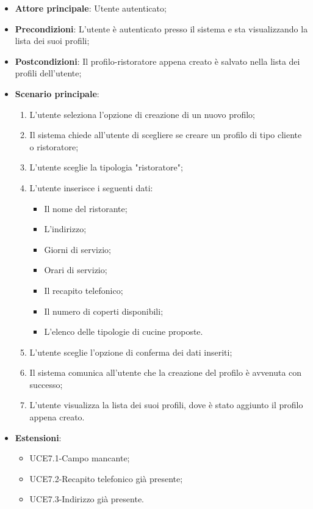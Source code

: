 \begin{itemize}
\item \textbf{Attore principale}: Utente autenticato;
\item \textbf{Precondizioni}: L'utente è autenticato presso il sistema e sta visualizzando la lista dei suoi profili;
\item \textbf{Postcondizioni}: Il profilo-ristoratore appena creato è salvato nella lista dei profili dell'utente;
\item \textbf{Scenario principale}:
\begin{enumerate}
\item L'utente seleziona l'opzione di creazione di un nuovo profilo;
\item Il sistema chiede all'utente di scegliere se creare un profilo di tipo cliente o ristoratore;
\item L'utente sceglie la tipologia "ristoratore";
\item L'utente inserisce i seguenti dati:
\begin{itemize}
\item Il nome del ristorante;
\item L'indirizzo;
\item Giorni di servizio;
\item Orari di servizio;
\item Il recapito telefonico;
\item Il numero di coperti disponibili;
\item L'elenco delle tipologie di cucine proposte.
\end{itemize}
\item L'utente sceglie l'opzione di conferma dei dati inseriti;
\item Il sistema comunica all'utente che la creazione del profilo è avvenuta con successo;
\item L'utente visualizza la lista dei suoi profili, dove è stato aggiunto il profilo appena creato.
\end{enumerate}
\item \textbf{Estensioni}:
\begin{itemize}
\item UCE7.1-Campo mancante;
\item UCE7.2-Recapito telefonico già presente;
\item UCE7.3-Indirizzo già presente.
\end{itemize}
\end{itemize}

\pagebreak

